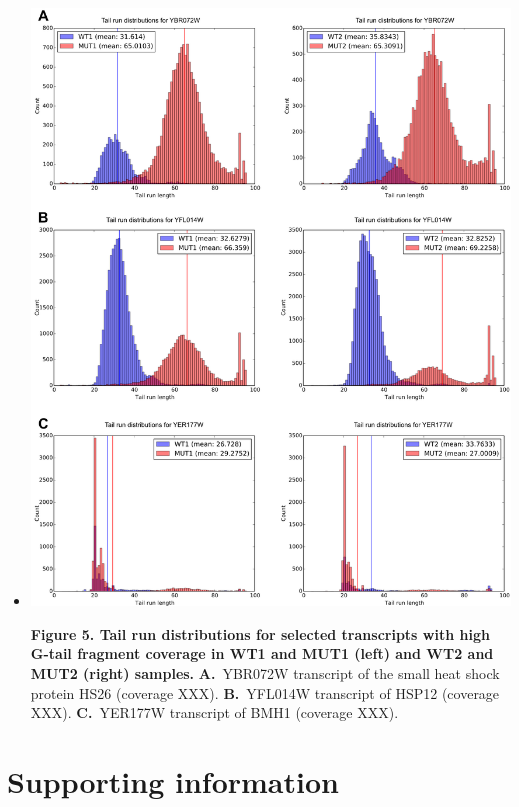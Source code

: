 \documentclass[10pt]{article}
\begin{document}
\begin{itemize}
\item[]{
\includegraphics[scale=0.8]{Figure5.png}

\textbf{Figure 5. Tail run distributions for selected transcripts with high G-tail fragment coverage in WT1 and MUT1 (left) and 
WT2 and MUT2 (right) samples.} \textbf{A.}~YBR072W transcript of the small heat shock protein HS26 (coverage XXX). \textbf{B.}~YFL014W transcript of HSP12 (coverage XXX). \textbf{C.}~YER177W transcript of BMH1 (coverage XXX).
}

\end{itemize}

\section*{Supporting information}
\end{document}
